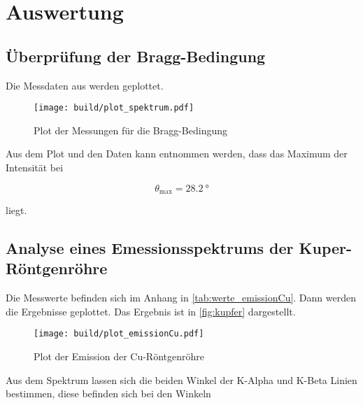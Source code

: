 \section{Auswertung}
\label{sec:Auswertung}



\subsection{Überprüfung der Bragg-Bedingung}
\label{ssec:1}

Die Messdaten aus \label{tab:bragg} werden geplottet.

\begin{figure}
    \centering
    \texttt{[image: build/plot\_spektrum.pdf]}
    \caption{Plot der Messungen für die Bragg-Bedingung}
    \label{fig:bragg}
\end{figure}

Aus dem Plot und den Daten kann entnommen werden, dass das Maximum der Intensität bei 

\begin{equation}
    \theta _\text{max} = \SI{28.2}{\degree}
\end{equation}

liegt.

\subsection{Analyse eines Emessionsspektrums der Kuper-Röntgenröhre}
\label{ssec:2}

Die Messwerte befinden sich im Anhang in \autoref{tab:werte_emissionCu}.
Dann werden die Ergebnisse geplottet.
Das Ergebnis ist in \autoref{fig:kupfer} dargestellt.

\begin{figure}
    \centering
    \texttt{[image: build/plot\_emissionCu.pdf]}
    \caption{Plot der Emission der Cu-Röntgenröhre}
    \label{fig:kupfer}
\end{figure}

Aus dem Spektrum lassen sich die beiden Winkel der K-Alpha und K-Beta Linien bestimmen, diese befinden sich bei den Winkeln

